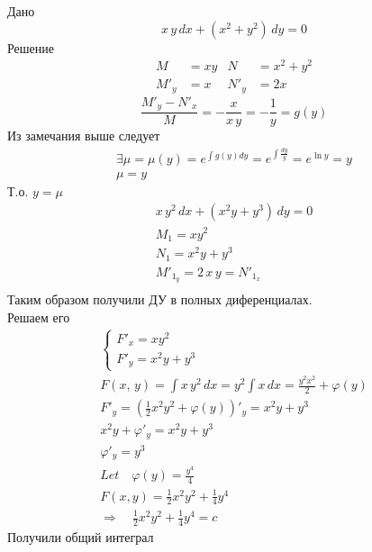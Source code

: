 \begin{Example}
    Дано
    \[
        x\,y\,dx+(x^2+y^2)\,dy=0
    \]
    Решение
    \begin{align*}
        M&=xy & N&=x^2+y^2\\
        M'_y&=x & N'_y&=2x
    \end{align*}
    \[
        \frac{M'_y-N'_x}{M}=-\frac{x}{x\,y}=-\frac{1}{y}=g(y)
    \]
    Из замечания выше следует\\
    \begin{align*}  
        \exists \mu=\mu(y)=e^{\int g(y)dy}=e^{\int \frac{dy}{y}}=e^{\ln y}=y\\
        \mu=y
    \end{align*}
    Т.о. $y=\mu$\\
    \begin{gather*} 
        x\,y^2\,dx+(x^2y+y^3)\,dy=0\\
        M_1=xy^2\\
        N_1=x^2y+y^3\\
        M'_{1_y}=2\,x\,y=N'_{1_x}\\
    \end{gather*}
    Таким образом получили ДУ в полных диференциалах.\\
    Решаем его
    \begin{gather*} 
        \begin{cases}
            F'_x=xy^2\\
            F'_y=x^2y+y^3
        \end{cases}\\
        F(x,\,y) = \int x\,y^2\,dx=y^2\int x\,dx=\frac{y^2 x^2}{2}+\varphi(y)\\
        F'_y=(\frac{1}{2}x^2y^2+\varphi(y))'_y=x^2y+y^3\\
        x^2y+\varphi'_y=x^2y+y^3\\
        \varphi'_y=y^3 \\
        Let \quad \varphi(y)=\frac{y^4}{4}\\
        F(x,y)=\frac{1}{2}x^2y^2+\frac{1}{4}y^4\\
        \Rightarrow \quad \frac{1}{2}x^2y^2+\frac{1}{4}y^4=c
    \end{gather*}
    Получили общий интеграл
\end{Example}
